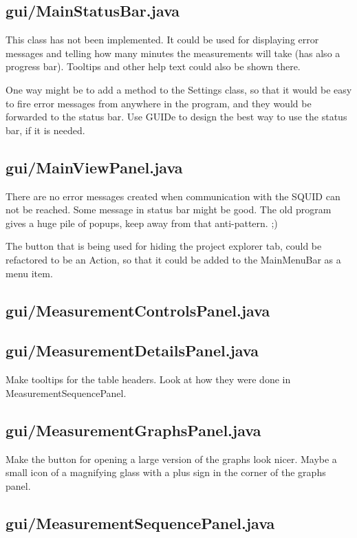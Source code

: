 \subsection{gui/MainStatusBar.java}

This class has not been implemented. It could be used for displaying error messages and telling how many minutes the measurements will take (has also a progress bar). Tooltips and other help text could also be shown there.

One way might be to add a method to the Settings class, so that it would be easy to fire error messages from anywhere in the program, and they would be forwarded to the status bar. Use GUIDe to design the best way to use the status bar, if it is needed.


\subsection{gui/MainViewPanel.java}

There are no error messages created when communication with the SQUID can not be reached. Some message in status bar might be good. The old program gives a huge pile of popups, keep away from that anti-pattern. ;)

The button that is being used for hiding the project explorer tab, could be refactored to be an Action, so that it could be added to the MainMenuBar as a menu item.


\subsection{gui/MeasurementControlsPanel.java}

\subsection{gui/MeasurementDetailsPanel.java}

Make tooltips for the table headers. Look at how they were done in MeasurementSequencePanel.


\subsection{gui/MeasurementGraphsPanel.java}

Make the button for opening a large version of the graphs look nicer. Maybe a small icon of a magnifying glass with a plus sign in the corner of the graphs panel.


\subsection{gui/MeasurementSequencePanel.java}

